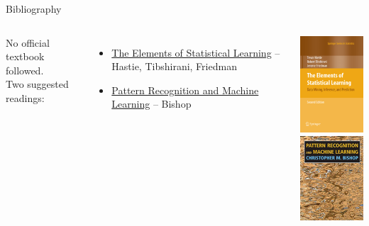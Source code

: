 \documentclass[aspectratio=169,10pt]{beamer}
\begin{document}
\begin{frame}{Bibliography}
	\begin{columns}
		No official textbook followed.\\
		\vspace{1cm}
		Two suggested readings:
		\begin{itemize}
			\item \href{https://web.stanford.edu/~hastie/Papers/ESLII.pdf}{The Elements of Statistical Learning} – Hastie, Tibshirani, Friedman
			\item \href{https://www.microsoft.com/en-us/research/uploads/prod/2006/01/Bishop-Pattern-Recognition-and-Machine-Learning-2006.pdf}{Pattern Recognition and Machine Learning} – Bishop
		\end{itemize}
		\includegraphics[width=0.55\linewidth, clip]{images/esl} \\
		\vspace{0.2cm}
		\includegraphics[width=0.55\linewidth, clip]{images/prml}
	\end{columns}
\end{frame}
\end{document}
